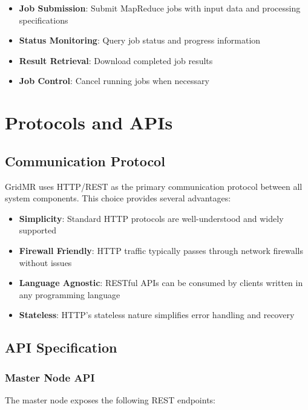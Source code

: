 \documentclass[11pt,letterpaper,oneside]{article}
\begin{document}
\begin{itemize}
    \item \textbf{Job Submission}: Submit MapReduce jobs with input data and processing specifications
    \item \textbf{Status Monitoring}: Query job status and progress information
    \item \textbf{Result Retrieval}: Download completed job results
    \item \textbf{Job Control}: Cancel running jobs when necessary
\end{itemize}


\section{Protocols and APIs}

\subsection{Communication Protocol}

GridMR uses HTTP/REST as the primary communication protocol between all system components. This choice provides several advantages:

\begin{itemize}
    \item \textbf{Simplicity}: Standard HTTP protocols are well-understood and widely supported
    \item \textbf{Firewall Friendly}: HTTP traffic typically passes through network firewalls without issues
    \item \textbf{Language Agnostic}: RESTful APIs can be consumed by clients written in any programming language
    \item \textbf{Stateless}: HTTP's stateless nature simplifies error handling and recovery
\end{itemize}

\subsection{API Specification}

\subsubsection{Master Node API}

The master node exposes the following REST endpoints:
\end{document}
